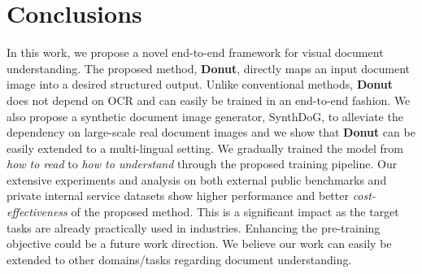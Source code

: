\documentclass[runningheads]{llncs}
\newcommand\oursb{{\textbf{\mbox{Donut}}}\xspace}
\begin{document}
\section{Conclusions} In this work, we propose a novel end-to-end framework for visual document understanding. The proposed method, \oursb, directly maps an input document image into a desired structured output.
Unlike conventional methods, \oursb does not depend on OCR and can easily be trained in an end-to-end fashion.
We also propose a synthetic document image generator, {SynthDoG}, to alleviate the dependency on large-scale real document images and we show that \oursb can be easily extended to a multi-lingual setting.
We gradually trained the model from \textit{how to read} to \textit{how to understand} through the proposed training pipeline.
Our extensive experiments and analysis on both external public benchmarks and private internal service datasets show higher performance and better \textit{cost-effectiveness} of the proposed method. This is a significant impact as the target tasks are already practically used in industries.
Enhancing the pre-training objective could be a future work direction. We believe our work can easily be extended to other domains/tasks regarding document understanding.
 
\clearpage
\end{document}
